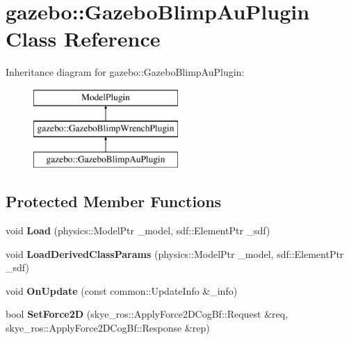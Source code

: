 \hypertarget{classgazebo_1_1_gazebo_blimp_au_plugin}{\section{gazebo\-:\-:Gazebo\-Blimp\-Au\-Plugin Class Reference}
\label{classgazebo_1_1_gazebo_blimp_au_plugin}
}
Inheritance diagram for gazebo\-:\-:Gazebo\-Blimp\-Au\-Plugin\-:\begin{figure}[H]
\begin{center}
\leavevmode
\includegraphics[height=3.000000cm]{classgazebo_1_1_gazebo_blimp_au_plugin}
\end{center}
\end{figure}
\subsection*{Protected Member Functions}
\begin{DoxyCompactItemize}
\item 
\hypertarget{classgazebo_1_1_gazebo_blimp_au_plugin_a55034cd0a7ef1e63f5fceea49ee96a9a}{void {\bfseries Load} (physics\-::\-Model\-Ptr \-\_\-model, sdf\-::\-Element\-Ptr \-\_\-sdf)}\label{classgazebo_1_1_gazebo_blimp_au_plugin_a55034cd0a7ef1e63f5fceea49ee96a9a}

\item 
\hypertarget{classgazebo_1_1_gazebo_blimp_au_plugin_a88959dd91977636408c6b48cc2eb9c21}{void {\bfseries Load\-Derived\-Class\-Params} (physics\-::\-Model\-Ptr \-\_\-model, sdf\-::\-Element\-Ptr \-\_\-sdf)}\label{classgazebo_1_1_gazebo_blimp_au_plugin_a88959dd91977636408c6b48cc2eb9c21}

\item 
\hypertarget{classgazebo_1_1_gazebo_blimp_au_plugin_ac04862eedaaf50d86b491c9b003c54c6}{void {\bfseries On\-Update} (const common\-::\-Update\-Info \&\-\_\-info)}\label{classgazebo_1_1_gazebo_blimp_au_plugin_ac04862eedaaf50d86b491c9b003c54c6}

\item 
\hypertarget{classgazebo_1_1_gazebo_blimp_au_plugin_a52c61d5436940937d8763f78c217bef3}{bool {\bfseries Set\-Force2\-D} (skye\-\_\-ros\-::\-Apply\-Force2\-D\-Cog\-Bf\-::\-Request \&req, skye\-\_\-ros\-::\-Apply\-Force2\-D\-Cog\-Bf\-::\-Response \&rep)}\label{classgazebo_1_1_gazebo_blimp_au_plugin_a52c61d5436940937d8763f78c217bef3}

\end{DoxyCompactItemize}
